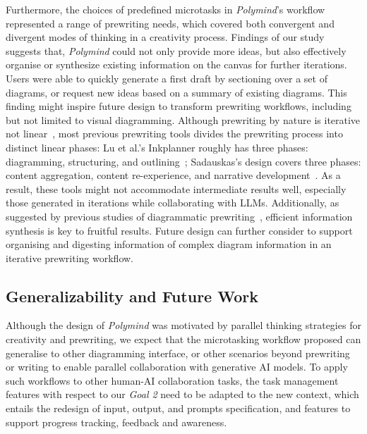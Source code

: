 Furthermore, the choices of predefined microtasks in \textit{Polymind}'s workflow represented a range of prewriting needs, which covered both convergent and divergent modes of thinking in a creativity process. Findings of our study suggests that, \textit{Polymind} could not only provide more ideas, but also effectively organise or synthesize existing information on the canvas for further iterations. Users were able to quickly generate a first draft by sectioning over a set of diagrams, or request new ideas based on a summary of existing diagrams. This finding might inspire future design to transform prewriting workflows, including but not limited to visual diagramming. Although prewriting by nature is iterative not linear~\cite{rohman1965pre}, most previous prewriting tools divides the prewriting process into distinct linear phases: Lu et al.'s Inkplanner roughly has three phases: diagramming, structuring, and outlining~\cite{lu2018inkplanner}; Sadauskas's design covers three phases: content aggregation, content re-experience, and narrative development~\cite{sadauskas2015mining}. As a result, these tools might not accommodate intermediate results well, especially those generated in iterations while collaborating with LLMs. Additionally, as suggested by previous studies of diagrammatic prewriting~\cite{davies2011concept,lorenz2009using}, efficient information synthesis is key to fruitful results. Future design can further consider to support organising and digesting information of complex diagram information in an iterative prewriting workflow.

\subsection{Generalizability and Future Work}
Although the design of \textit{Polymind} was motivated by parallel thinking strategies for creativity and prewriting, we expect that the microtasking workflow proposed can generalise to other diagramming interface, or other scenarios beyond prewriting or writing to enable parallel collaboration with generative AI models. 
To apply such workflows to other human-AI collaboration tasks, the task management features with respect to our \textit{Goal 2} need to be adapted to the new context, which entails the redesign of input, output, and prompts specification, and features to support progress tracking, feedback and awareness.

